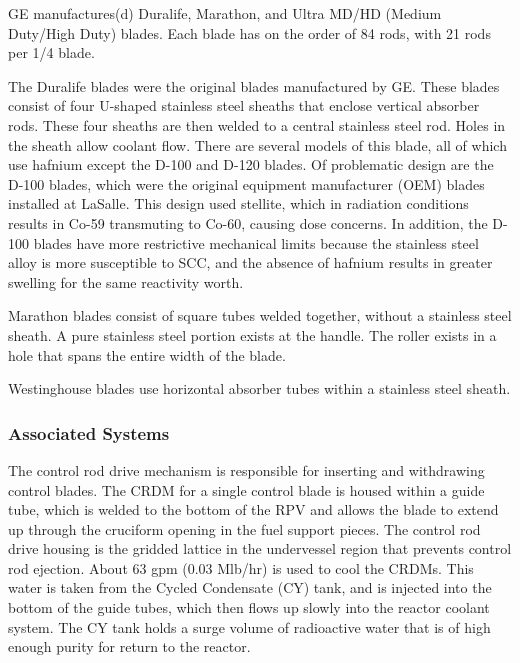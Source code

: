 \documentclass[10pt]{article}
\newcounter{subsubsubsection}[subsubsection]
\begin{document}

GE manufactures(d) Duralife, Marathon, and Ultra MD/HD (Medium Duty/High Duty) blades. Each blade has on the order of 84 rods, with 21 rods per 1/4 blade. 

The Duralife blades were the original blades manufactured by GE. These blades consist of four U-shaped stainless steel sheaths that enclose vertical absorber rods. These four sheaths are then welded to a central stainless steel rod. Holes in the sheath allow coolant flow. There are several models of this blade, all of which use hafnium except the D-100 and D-120 blades. Of problematic design are the D-100 blades, which were the original equipment manufacturer (OEM) blades installed at LaSalle. This design used stellite, which in radiation conditions results in Co-59 transmuting to Co-60, causing dose concerns. In addition, the D-100 blades have more restrictive mechanical limits because the stainless steel alloy is more susceptible to SCC, and the absence of hafnium results in greater swelling for the same reactivity worth. 

Marathon blades consist of square tubes welded together, without a stainless steel sheath. A pure stainless steel portion exists at the handle. The roller exists in a hole that spans the entire width of the blade. 


Westinghouse blades use horizontal absorber tubes within a stainless steel sheath. 


\subsubsection{Associated Systems}


The control rod drive mechanism is responsible for inserting and withdrawing control blades. The CRDM for a single control blade is housed within a guide tube, which is welded to the bottom of the RPV and allows the blade to extend up through the cruciform opening in the fuel support pieces. The control rod drive housing is the gridded lattice in the undervessel region that prevents control rod ejection. About 63 gpm (0.03 Mlb/hr) is used to cool the CRDMs. This water is taken from the Cycled Condensate (CY) tank, and is injected into the bottom of the guide tubes, which then flows up slowly into the reactor coolant system. The CY tank holds a surge volume of radioactive water that is of high enough purity for return to the reactor.
\end{document}
